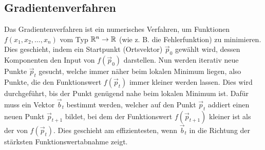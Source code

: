 \begin{appendices}

\chapter{Gradientenverfahren}\label{sec:anhang_gd}
Das Gradientenverfahren ist ein numerisches Verfahren, um Funktionen $f(x_1,
x_2, \ldots, x_n)$ vom Typ $\mathbb{R}^n \to \mathbb{R}$ (wie z. B. die Fehlerfunktion)
zu minimieren.
Dies geschieht, indem ein Startpunkt (Ortsvektor) $\vec{p}_0$ gewählt wird, dessen
Komponenten den Input von $f(\vec{p}_0)$ darstellen.
Nun werden iterativ neue Punkte $\vec{p}_t$ gesucht, welche immer näher beim lokalen Minimum liegen, also Punkte, die den Funktionswert $f(\vec{p}_t)$ immer kleiner werden lassen.
Dies wird durchgeführt, bis der Punkt genügend nahe beim lokalen Minimum ist.
\para{}
Dafür muss ein Vektor $\vec{b}_t$ bestimmt werden, welcher auf den Punkt $\vec{p}_t$ addiert einen neuen Punkt $\vec{p}_{t+1}$ bildet,
bei dem der Funktionswert $f(\vec{p}_{t+1})$ kleiner ist als der von $f(\vec{p}_t)$.
Dies geschieht am effizientesten, wenn $\vec{b}_t$ in die Richtung der stärksten Funktionswertabnahme zeigt.


\end{appendices}
